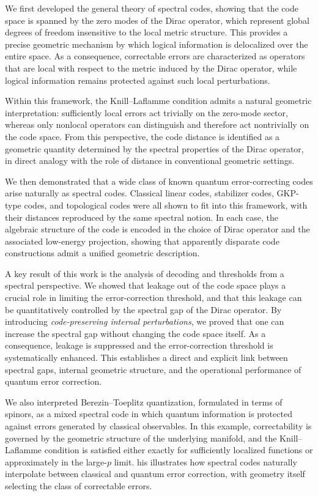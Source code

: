 \documentclass[12pt]{article}
\theoremstyle{definition} %
\theoremstyle{plain} %
\theoremstyle{remark} %
\theoremstyle{underline}
\begin{document}
We first developed the general theory of spectral codes, showing that the code space is spanned by the zero modes of the Dirac operator, which represent global degrees of freedom insensitive to the local metric structure.
This provides a precise geometric mechanism by which logical information is delocalized over the entire space.
As a consequence, correctable errors are characterized as operators that are local with respect to the metric induced by the Dirac operator, while logical information remains protected against such local perturbations.

Within this framework, the Knill--Laflamme condition admits a natural geometric interpretation: sufficiently local errors act trivially on the zero-mode sector, whereas only nonlocal operators can distinguish and therefore act nontrivially on the code space.
From this perspective, the code distance is identified as a geometric quantity determined by the spectral properties of the Dirac operator, in direct analogy with the role of distance in conventional geometric settings.

We then demonstrated that a wide class of known quantum error-correcting codes arise naturally as spectral codes.
Classical linear codes, stabilizer codes, GKP-type codes, and topological codes were all shown to fit into this framework, with their distances reproduced by the same spectral notion.
In each case, the algebraic structure of the code is encoded in the choice of Dirac operator and the associated low-energy projection, showing that apparently disparate code constructions admit a unified geometric description.

A key result of this work is the analysis of decoding and thresholds from a spectral perspective.
We showed that leakage out of the code space plays a crucial role in limiting the error-correction threshold, and that this leakage can be quantitatively controlled by the spectral gap of the Dirac operator.
By introducing \emph{code-preserving internal perturbations}, we proved that one can increase the spectral gap without changing the code space itself.
As a consequence, leakage is suppressed and the error-correction threshold is systematically enhanced.
This establishes a direct and explicit link between spectral gaps, internal geometric structure, and the operational performance of quantum error correction.

We also interpreted Berezin--Toeplitz quantization, formulated in terms of spinors, as a mixed spectral code in which quantum information is protected against errors generated by classical observables.
In this example, correctability is governed by the geometric structure of the underlying manifold, and the Knill--Laflamme condition is satisfied either exactly for sufficiently localized functions or approximately in the large-$p$ limit.
his illustrates how spectral codes naturally interpolate between classical and quantum error correction, with geometry itself selecting the class of correctable errors.
\end{document}

